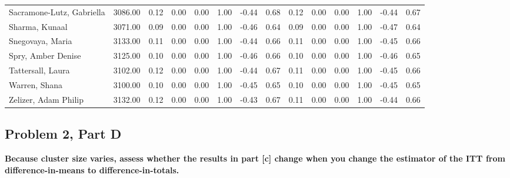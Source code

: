 \documentclass[11pt,notitlepage]{article}
\begin{document}
\begin{table}[h!]
\begin{center}
\begin{tabular}{lrrrrrrr|rrrrrr}
  Sacramone-Lutz, Gabriella & 3086.00 & 0.12 & 0.00 & 0.00 & 1.00 & -0.44 & 0.68 & 0.12 & 0.00 & 0.00 & 1.00 & -0.44 & 0.67 \\ 
  Sharma, Kunaal & 3071.00 & 0.09 & 0.00 & 0.00 & 1.00 & -0.46 & 0.64 & 0.09 & 0.00 & 0.00 & 1.00 & -0.47 & 0.64 \\ 
  Snegovaya, Maria & 3133.00 & 0.11 & 0.00 & 0.00 & 1.00 & -0.44 & 0.66 & 0.11 & 0.00 & 0.00 & 1.00 & -0.45 & 0.66 \\ 
  Spry, Amber Denise & 3125.00 & 0.10 & 0.00 & 0.00 & 1.00 & -0.46 & 0.66 & 0.10 & 0.00 & 0.00 & 1.00 & -0.46 & 0.65 \\ 
  Tattersall, Laura & 3102.00 & 0.12 & 0.00 & 0.00 & 1.00 & -0.44 & 0.67 & 0.11 & 0.00 & 0.00 & 1.00 & -0.45 & 0.66 \\ 
  Warren, Shana & 3100.00 & 0.10 & 0.00 & 0.00 & 1.00 & -0.45 & 0.65 & 0.10 & 0.00 & 0.00 & 1.00 & -0.45 & 0.65 \\ 
  Zelizer, Adam Philip & 3132.00 & 0.12 & 0.00 & 0.00 & 1.00 & -0.43 & 0.67 & 0.11 & 0.00 & 0.00 & 1.00 & -0.44 & 0.66 \\ 
   \hline
\end{tabular}
\end{center}
\end{table}


\clearpage

\subsection{Problem 2, Part D} {\bf Because cluster size varies, assess whether the results in part [c] change when you change the estimator of the ITT from difference-in-means to difference-in-totals.}

\vspace{1cm}
\end{document}
